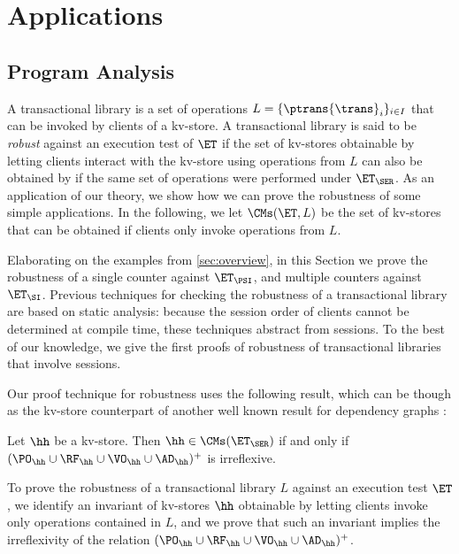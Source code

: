 \section{Applications}
\label{sec:applications}

\subsection{Program Analysis}
\label{sec:program-analysis}
A transactional library is a set of operations 
$L = \{\ptrans{\trans}_{i}\}_{i \in I}$ that can be invoked 
by clients of a kv-store. A transactional library is said to be 
\emph{robust} against an execution test of $\ET$ if the set of kv-stores 
obtainable by letting clients interact with the kv-store using 
operations from $L$ can also be obtained by if the same 
set of operations were performed under $\ET_{\SER}$.
As an application of our theory, we show how we 
can prove the robustness of some simple applications. 
In the following, we let $\CMs(\ET, L)$ be 
the set of kv-stores that can be obtained if clients 
only invoke operations from $L$.

Elaborating on the examples from \cref{sec:overview}, in this Section 
we prove the robustness of a single counter against $\ET_{\PSI}$, 
and multiple counters against $\ET_{\SI}$. Previous techniques for 
checking the robustness of a transactional library \cite{giovanni_concur16,SIanalysis,laws,sureshConcur} 
are based on static analysis: because the session order of clients cannot be determined at compile 
time, these techniques abstract from sessions. To the best of our knowledge, 
we give the first proofs of robustness of transactional libraries that involve sessions.

Our proof technique for robustness uses the following result, which can be though 
as the kv-store counterpart of another well known result for dependency graphs \cite{adya}:
\begin{theorem}
Let $\hh$ be a kv-store. Then $\hh \in \CMs(\ET_{\SER})$ if and only if $(\PO_{\hh} \cup \RF_{\hh} 
\cup \VO_{\hh} \cup \AD_{\hh})^{+}$ is irreflexive.
\end{theorem}
To prove the robustness of a transactional library $L$ against an execution test 
$\ET$, we identify an invariant of kv-stores $\hh$ obtainable by letting clients 
invoke only operations contained in $L$, and we prove that such an invariant 
implies the irreflexivity of the relation $(\PO_{\hh} \cup \RF_{\hh} \cup \VO_{\hh} \cup 
\AD_{\hh})^{+}$.

